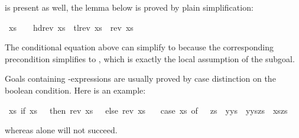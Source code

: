 \begin{isabellebody}
\begin{isamarkuptext}
is present as well,
the lemma below is proved by plain simplification:%
\end{isamarkuptext}%
\isamarkuptrue%
\ {\isachardoublequote}xs\ {\isasymnoteq}\ {\isacharbrackleft}{\isacharbrackright}\ {\isasymLongrightarrow}\ hd{\isacharparenleft}rev\ xs{\isacharparenright}\ {\isacharhash}\ tl{\isacharparenleft}rev\ xs{\isacharparenright}\ {\isacharequal}\ rev\ xs{\isachardoublequote}\isamarkupfalse%
\isanewline
\isamarkupfalse%
%
\begin{isamarkuptext}%
\noindent
The conditional equation  above
can simplify  to 
because the corresponding precondition 
simplifies to , which is exactly the local
assumption of the subgoal.%
\end{isamarkuptext}%
\isamarkuptrue%
%
\isamarkuptrue%
%
\begin{isamarkuptext}%
\label{sec:AutoCaseSplits}%
Goals containing -expressions
are usually proved by case
distinction on the boolean condition.  Here is an example:%
\end{isamarkuptext}%
\isamarkuptrue%
\ {\isachardoublequote}{\isasymforall}xs{\isachardot}\ if\ xs\ {\isacharequal}\ {\isacharbrackleft}{\isacharbrackright}\ then\ rev\ xs\ {\isacharequal}\ {\isacharbrackleft}{\isacharbrackright}\ else\ rev\ xs\ {\isasymnoteq}\ {\isacharbrackleft}{\isacharbrackright}{\isachardoublequote}\isamarkupfalse%
\isamarkuptrue%
\isamarkupfalse%
\isamarkuptrue%
\isamarkupfalse%
\ {\isachardoublequote}{\isacharparenleft}case\ xs\ of\ {\isacharbrackleft}{\isacharbrackright}\ {\isasymRightarrow}\ zs\ {\isacharbar}\ y{\isacharhash}ys\ {\isasymRightarrow}\ y{\isacharhash}{\isacharparenleft}ys{\isacharat}zs{\isacharparenright}{\isacharparenright}\ {\isacharequal}\ xs{\isacharat}zs{\isachardoublequote}\isanewline
\isamarkupfalse%
\isamarkupfalse%
\isamarkuptrue%
\isanewline
\isamarkupfalse%
\isamarkupfalse%
\isamarkupfalse%
\isamarkupfalse%
%
\begin{isamarkuptext}%
\noindent
whereas  alone will not succeed.


\end{isamarkuptext}
\end{isabellebody}
